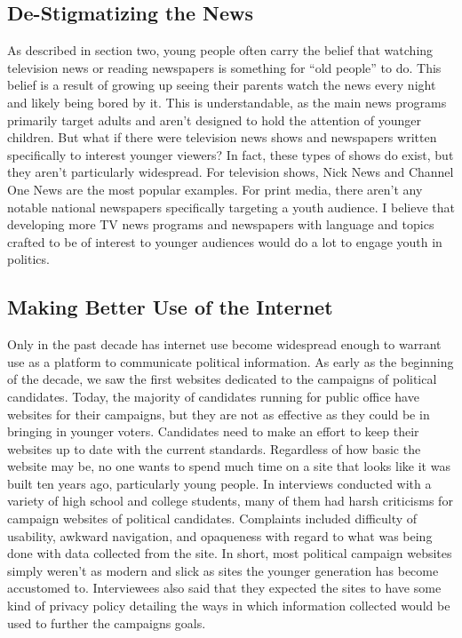 \documentclass[12pt,letterpaper]{article}
\begin{document}
\subsection{De-Stigmatizing the News}
As described in section two, young people often carry the belief that
watching television news or reading newspapers is something for ``old
people'' to do.  This belief is a result of growing up seeing their
parents watch the news every night and likely being bored by it.
This is understandable, as the main news programs primarily target
adults and aren't designed to hold the attention of younger children.
But what if there were television news shows and newspapers written
specifically to interest younger viewers?  In fact, these types of
shows do exist, but they aren't particularly widespread. For
television shows, Nick News and Channel One News are the most popular
examples.  For print media, there aren't any notable national
newspapers specifically targeting a youth audience. I believe that
developing more TV news programs and newspapers with language and
topics crafted to be of interest to younger audiences would do a lot
to engage youth in politics.  

\subsection{Making Better Use of the Internet}
Only in the past decade has internet use become widespread enough to
warrant use as a platform to communicate political information.  As
early as the beginning of the decade, we saw the first websites
dedicated to the campaigns of political candidates.  Today, the
majority of candidates running for public office have websites for
their campaigns, but they are not as effective as they could be in
bringing in younger voters. Candidates need to make an effort to keep
their websites up to date with the current standards.  Regardless of
how basic the website may be, no one wants to spend much time on a
site that looks like it was built ten years ago, particularly young
people.  In interviews conducted with a variety of high school and
college students, many of them had harsh criticisms for campaign
websites of political candidates.  Complaints included difficulty of
usability, awkward navigation, and opaqueness with regard to what was
being done with data collected from the site.  In short, most
political campaign websites simply weren't as modern and slick as
sites the younger generation has become accustomed to.  Interviewees
also said that they expected the sites to have some kind of privacy
policy detailing the ways in which information collected would be used
to further the campaigns goals. 
\end{document}
